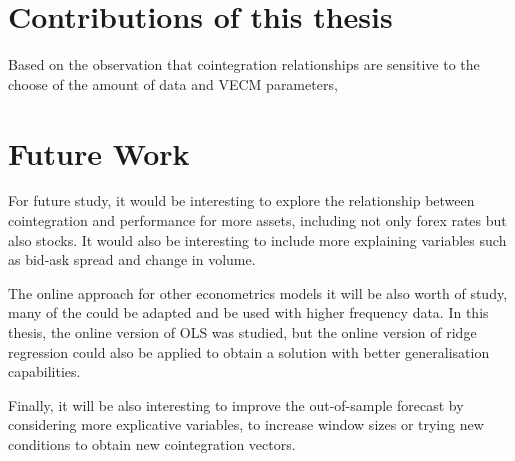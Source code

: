 \section{Contributions of this thesis}


Based on the observation that cointegration
relationships are sensitive to the choose of the amount of data and VECM
parameters,

\section{Future Work}

For future study, it would be interesting to explore the relationship between
cointegration and performance for more assets, including not only forex rates
but also stocks. It would also be interesting to include more explaining
variables such as bid-ask spread and change in volume.

The online approach for other econometrics models it will be also worth of
study, many of the could be adapted and be used with higher frequency data. In
this thesis, the online version of OLS was studied, but the online version of
ridge regression could also be applied to obtain a solution with better
generalisation capabilities.

Finally, it will be also interesting to improve the out-of-sample forecast
by considering more explicative variables, to increase window sizes or trying new
conditions to obtain new cointegration vectors.


